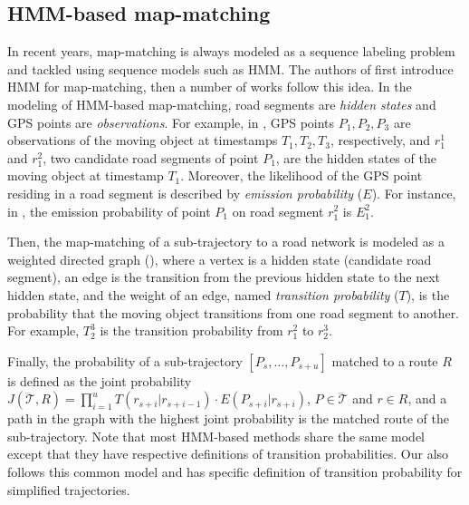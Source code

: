 \subsection{HMM-based map-matching}
In recent years, map-matching is always modeled as a sequence labeling problem and tackled using sequence models such as HMM.
The authors of \cite{Lamb1999Avoiding} first introduce HMM for map-matching, then a number of works \cite{Newson2009Hidden, Wang:eddy, Osogami:2013:IRL, yin:feature-based} follow this idea.
%
In the modeling of HMM-based map-matching, road segments are \emph{hidden states} and GPS points are \emph{observations}.
For example, in , GPS points $P_1,P_2,P_3$ are observations of the moving object at timestamps $T_1,T_2,T_3$, respectively,
and $r_1^1$ and $r_1^2$, two {candidate road segments} of point $P_1$, are the hidden states of the moving object at timestamp $T_1$.
Moreover, the likelihood of the GPS point residing in a road segment is described by \emph{emission probability} ($E$). For instance, in , the emission probability of point $P_1$ on road segment {$r_1^2$ is $E_1^2$}.

Then, the map-matching of a sub-trajectory to a road network is
modeled as a weighted directed graph (), where a vertex is a hidden state (candidate road segment), an edge is the transition from the previous hidden state to the next hidden state, and the weight of an edge, named \emph{transition probability} ($T$), is the probability that the moving object transitions from one road segment to another. For example, {$T_{2}^3$} is the transition probability from {$r_1^2$ to $r_2^3$}.

Finally, the probability of a sub-trajectory $[P_s, \ldots, P_{s+u}]$ matched to a route $R$ is defined as the joint probability $J(\dddot{\mathcal{T}}, R) = \prod_{i=1}^u{T(r_{s+i}|r_{s+i-1})\cdot E(P_{s+i}|r_{s+i})}$, $P\in \dddot{\mathcal{T}}$ and $r\in R$, and a path in the graph with the highest joint probability is the matched route of the sub-trajectory.
Note that most HMM-based methods share the same model except that they have respective definitions of transition probabilities.
Our \stmm also follows this common model and has specific definition of
transition probability for simplified {trajectories}.



